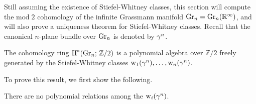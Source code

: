 \documentclass[../main]{subfiles}
\begin{document}
Still assuming the existence of Stiefel-Whitney classes, this section will compute the $\mathrm{mod}\; 2$ cohomology of the infinite Grassmann manifold $\operatorname{Gr}_n=\operatorname{Gr}_n(\mathbb{R}^\infty)$, and will also prove a uniqueness theorem for Stiefel-Whitney classes. Recall that the canonical $n$-plane bundle over $\operatorname{Gr}_n$ is denoted by $\gamma^{n}$.
\begin{theorem}
\label{thm:07.01}
The cohomology ring $\operatorname{H}^{\ast}(\operatorname{Gr}_n ; \, \mathbb{Z} / 2)$ is a polynomial algebra over $\mathbb{Z} / 2$ freely generated by the Stiefel-Whitney classes $\operatorname{w}_{1}(\gamma^{n}), \dots, \operatorname{w}_{n}(\gamma^{n})$.
\end{theorem}
To prove this result, we first show the following.
\begin{lemma}
\label{lem:07.02}
There are no polynomial relations among the $\operatorname{w}_{i}(\gamma^{n})$.
\end{lemma}
\end{document}
